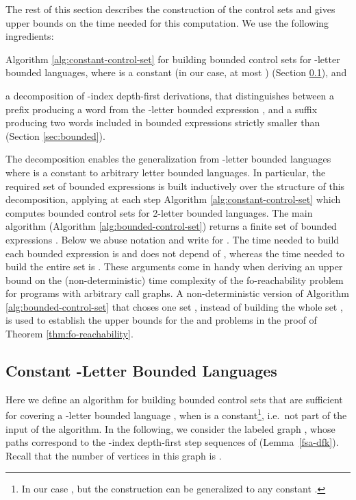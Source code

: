 \documentclass[final]{llncs}
\begin{document}
The rest of this section describes the construction of the control
sets  and gives upper bounds on the time needed
for this computation. We use the following ingredients:
\begin{inparaenum} 
\item Algorithm \ref{alg:constant-control-set} for building 
bounded control sets for -letter bounded languages, where  is a constant 
(in our case, at most ) (Section \ref{sec:constant-control-set}), and
\item a decomposition of -index depth-first derivations, that 
distinguishes between a prefix producing a word from the -letter
bounded expression , and a suffix producing two words
included in bounded expressions strictly smaller than 
(Section \ref{sec:bounded}). 
\end{inparaenum}
The decomposition enables the generalization from -letter bounded
languages where  is a constant to arbitrary letter bounded
languages. In particular, the required set of bounded
expressions  is built inductively over the
structure of this decomposition, applying at each step
Algorithm \ref{alg:constant-control-set} which computes bounded
control sets for 2-letter bounded languages. The main algorithm
(Algorithm \ref{alg:bounded-control-set}) returns a finite
set  of bounded expressions
. Below we abuse notation and
write 
for . The time needed to build each
bounded expression  is
 and does not depend of ,
whereas the time needed to build the entire set 
is . These arguments come in handy when
deriving an upper bound on the (non-deterministic) time complexity of
the fo-reachability problem for programs with arbitrary call graphs.
A non-deterministic version of Algorithm \ref{alg:bounded-control-set}
that choses one set , instead of
building the whole set , is used to establish the
upper bounds for the 
and  problems in the proof of
Theorem \ref{thm:fo-reachability}.

\subsection{Constant -Letter Bounded Languages}\label{sec:constant-control-set}

Here we define an algorithm for building
bounded control sets that are sufficient for covering a -letter
bounded language , when
 is a constant\footnote{In our case , but the
construction can be generalized to any constant . }, i.e.\
not part of the input of the algorithm. In the following, we consider
the labeled graph ,
whose paths correspond to the -index depth-first step sequences of
 (Lemma~\ref{fsa-dfk}). Recall that the number of vertices in this
graph is . 
\end{document}
